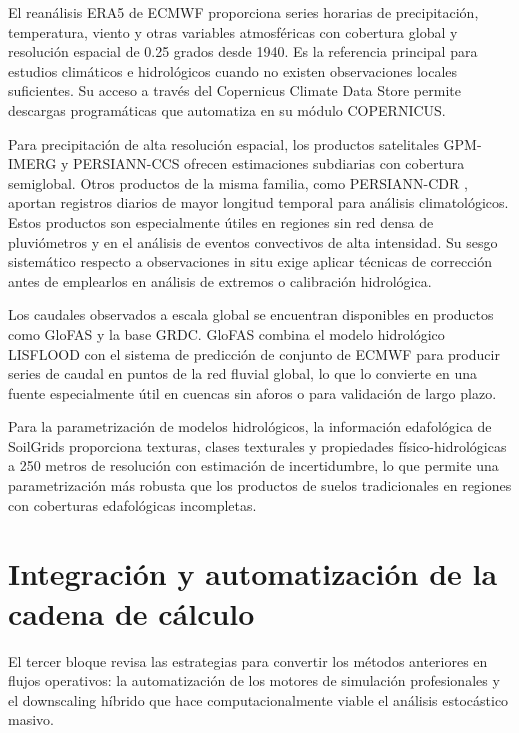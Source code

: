 El reanálisis ERA5 de ECMWF \parencite{hersbach2020era5} proporciona series horarias de precipitación, temperatura, viento y otras variables atmosféricas con cobertura global y resolución espacial de 0.25 grados desde 1940. Es la referencia principal para estudios climáticos e hidrológicos cuando no existen observaciones locales suficientes. Su acceso a través del Copernicus Climate Data Store permite descargas programáticas que \hydra automatiza en su módulo COPERNICUS.

Para precipitación de alta resolución espacial, los productos satelitales GPM-IMERG \parencite{huffman2020gpm} y PERSIANN-CCS \parencite{hong2004persiannccs} ofrecen estimaciones subdiarias con cobertura semiglobal. Otros productos de la misma familia, como PERSIANN-CDR \parencite{ashouri2015persiann}, aportan registros diarios de mayor longitud temporal para análisis climatológicos. Estos productos son especialmente útiles en regiones sin red densa de pluviómetros y en el análisis de eventos convectivos de alta intensidad. Su sesgo sistemático respecto a observaciones in situ exige aplicar técnicas de corrección antes de emplearlos en análisis de extremos o calibración hidrológica.

Los caudales observados a escala global se encuentran disponibles en productos como GloFAS \parencite{alfieri2013glofas} y la base GRDC. GloFAS combina el modelo hidrológico LISFLOOD con el sistema de predicción de conjunto de ECMWF para producir series de caudal en puntos de la red fluvial global, lo que lo convierte en una fuente especialmente útil en cuencas sin aforos o para validación de largo plazo.

Para la parametrización de modelos hidrológicos, la información edafológica de SoilGrids \parencite{poggio2021soilgrids} proporciona texturas, clases texturales y propiedades físico-hidrológicas a 250 metros de resolución con estimación de incertidumbre, lo que permite una parametrización más robusta que los productos de suelos tradicionales en regiones con coberturas edafológicas incompletas.

\section{Integración y automatización de la cadena de cálculo}
\label{sec:integracion_automatizacion}

El tercer bloque revisa las estrategias para convertir los métodos anteriores en flujos operativos: la automatización de los motores de simulación profesionales y el downscaling híbrido que hace computacionalmente viable el análisis estocástico masivo.

